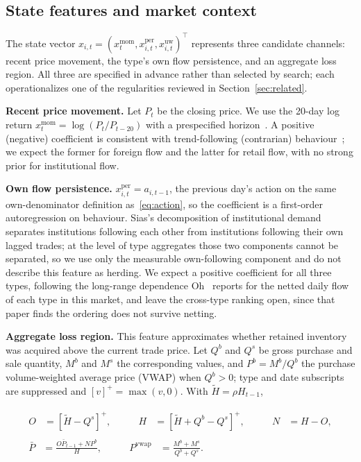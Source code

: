 \documentclass[sigconf,anonymous,review]{acmart}
\begin{document}
\subsection{State features and market context}
\label{sec:method-features}

The state vector $x_{i,t} = (x^{\mathrm{mom}}_{t}, x^{\mathrm{per}}_{i,t},
x^{\mathrm{uw}}_{i,t})^{\top}$ represents three candidate channels:
recent price movement, the type's own flow persistence, and an aggregate
loss region. All three are specified in advance rather than selected by
search; each operationalizes one of the regularities reviewed in
Section~\ref{sec:related}.

\textbf{Recent price movement.} Let $P_t$ be the closing price. We use
the 20-day log return $x^{\mathrm{mom}}_t = \log(P_t / P_{t-20})$ with a
prespecified horizon~\cite{jegadeesh_titman}. A positive (negative)
coefficient is consistent with trend-following (contrarian)
behaviour~\cite{choe_kho_stulz,grinblatt_keloharju2001}; we expect the
former for foreign flow and the latter for retail flow, with no strong
prior for institutional flow.

\textbf{Own flow persistence.} $x^{\mathrm{per}}_{i,t} = a_{i,t-1}$, the
previous day's action on the same own-denominator definition
as~\eqref{eq:action}, so the coefficient is a first-order autoregression
on behaviour. Sias's decomposition of institutional
demand~\cite{sias2004} separates institutions following each other from
institutions following their own lagged trades; at the level of type
aggregates those two components cannot be separated, so we use only the
measurable own-following component and do not describe this feature as
herding. We expect a positive coefficient for all three types, following
the long-range dependence Oh~\cite{oh2025} reports for the netted daily
flow of each type in this market, and leave the cross-type ranking open,
since that paper finds the ordering does not survive netting.

\textbf{Aggregate loss region.} This feature approximates whether
retained inventory was acquired above the current trade price. Let $Q^b$
and $Q^s$ be gross purchase and sale quantity, $M^b$ and $M^s$ the
corresponding values, and $P^b = M^b / Q^b$ the purchase
volume-weighted average price (VWAP) when
$Q^b > 0$; type and date subscripts are suppressed and
$[v]^{+} = \max(v, 0)$. With $\tilde H = \rho H_{t-1}$,

\begin{equation}
  \label{eq:underwater}
  \begin{gathered}
    \begin{alignedat}{3}
      O &= [\tilde H - Q^s]^{+}, \qquad &
      H &= [\tilde H + Q^b - Q^s]^{+}, \qquad &
      N &= H - O,
    \end{alignedat} \\[2pt]
    \begin{alignedat}{2}
      \bar P &= \frac{O \bar P_{t-1} + N P^b}{H}, \qquad &
      P^{\mathrm{vwap}} &= \frac{M^b + M^s}{Q^b + Q^s}.
    \end{alignedat}
  \end{gathered}
\end{equation}
\end{document}
